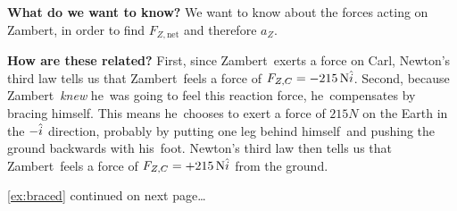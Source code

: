 \documentclass[11pt,letter,openany,makeidx]{book}
\newcommand{\studentC}{Carl}        \newcommand{\massC}{\mbox{$90.0\unit{kg}$}}
\newcommand{\studentZ}{Zambert}     \newcommand{\massZ}{\mbox{$95.0\unit{kg}$}}
\newcommand{\heZ}{he}\newcommand{\himZ}{him}\newcommand{\hisZ}{his}\newcommand{\himselfZ}{himself}
\begin{document}
\begin{example}[p]
{\begin{minipage}{4.925in}
\textbf{What do we want to know?}  We want to know about the forces acting on \studentZ, in order to find  $F_{Z,\textrm{net}}$ and therefore $a_Z$.

\textbf{How are these related?}  First, since \studentZ\ exerts a force on \studentC, Newton's third law tells us that \studentZ\ feels a force of \mbox{$F_{Z,C}=-215 \,\mathrm{N}\hat i$}.
Second, because \studentZ\ \textit{knew} \heZ\ was going to feel this reaction force, \heZ\ compensates by bracing \himselfZ.  This means \heZ\ chooses to exert a force of $215\unit{N}$ on the Earth in the $-\hat i$ direction, probably by putting one leg behind \himselfZ\ and pushing the ground backwards with \hisZ\ foot.  Newton's third law then tells us that \studentZ\ feels a force of \mbox{$F_{Z,C}=+215 \,\mathrm{N}\hat i$} from the ground.

{}\hfill {\footnotesize \autoref*{ex:braced} continued on next page\ldots}
\end{minipage}}
\end{example}
\end{document}
